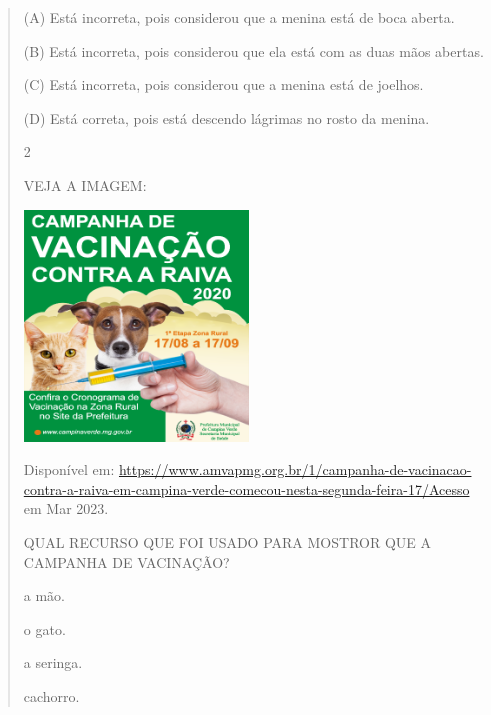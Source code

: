 \begin{verse}
{{{{(A) Está incorreta, pois considerou que a menina está de boca aberta.

(B) Está incorreta, pois considerou que ela está com as duas mãos
abertas.

(C) Está incorreta, pois considerou que a menina está de joelhos.

(D) Está correta, pois está descendo lágrimas no rosto da menina.

\num{2}

VEJA A IMAGEM:

\includegraphics[width=2.34507in,height=2.41801in]{media/image137.png}

Disponível em:
\url{https://www.amvapmg.org.br/1/campanha-de-vacinacao-contra-a-raiva-em-campina-verde-comecou-nesta-segunda-feira-17/Acesso}
em Mar 2023.

QUAL RECURSO QUE FOI USADO PARA MOSTROR QUE A CAMPANHA DE VACINAÇÃO?

\begin{escolha}
\item a mão.

\item o gato.

\item a seringa.

\itemo cachorro.
\end{escolha}

}}}}
\end{verse}
